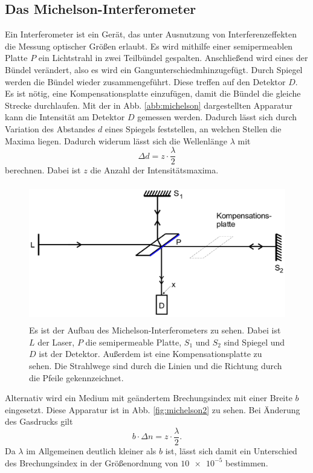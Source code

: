 \subsection{Das Michelson-Interferometer}
Ein Interferometer ist ein Gerät, das unter Ausnutzung von Interferenzeffekten die 
Messung optischer Größen erlaubt. 
Es wird mithilfe einer semipermeablen Platte $P$ ein Lichtstrahl in zwei Teilbündel 
gespalten. Anschließend wird eines der Bündel verändert, also es wird ein Gangunterschiedmhinzugefügt. Durch Spiegel werden die Bündel wieder zusammengeführt. Diese treffen auf den Detektor $D$.
Es ist nötig, eine Kompensationsplatte einzufügen, damit die Bündel die gleiche Strecke
durchlaufen.
Mit der in Abb. \ref{abb:michelson} dargestellten Apparatur kann die Intensität am 
Detektor $D$ gemessen werden. Dadurch lässt sich durch Variation des Abstandes $d$ eines Spiegels feststellen, an welchen Stellen die Maxima liegen. Dadurch widerum lässt sich die 
Wellenlänge $\lambda$ mit 
\begin{equation}
    \Delta d = z \cdot \frac{\lambda}{2}
    \label{eqn:lambda}
\end{equation}
berechnen. Dabei ist $z$ die Anzahl der Intensitätsmaxima.

\begin{figure}
    \centering
    \includegraphics[width=12cm, height=6cm]{build/michelson.png}
    \caption{Es ist der Aufbau des Michelson-Interferometers zu sehen. Dabei ist $L$ der Laser, $P$ die semipermeable Platte, $S_1$ und $S_2$ sind Spiegel und $D$ ist der Detektor. Außerdem ist eine Kompensationsplatte zu sehen. Die Strahlwege sind durch die Linien und die Richtung durch die Pfeile gekennzeichnet. \cite{V401}}
    \label{fig:michelson}
\end{figure}

\noindent Alternativ wird ein Medium mit geändertem Brechungsindex mit einer Breite $b$ eingesetzt.
Diese Apparatur ist in Abb. \ref{fig:michelson2} zu sehen.
Bei Änderung des Gasdrucks gilt
\begin{equation}
    b \cdot \Delta n = z \cdot \frac{\lambda}{2}.
    \label{eqn:deltan}
\end{equation}
Da $\lambda$ im Allgemeinen deutlich kleiner als $b$ ist, lässt sich damit ein 
Unterschied des Brechungsindex in der Größenordnung von $\num{10e-5}$ bestimmen.


